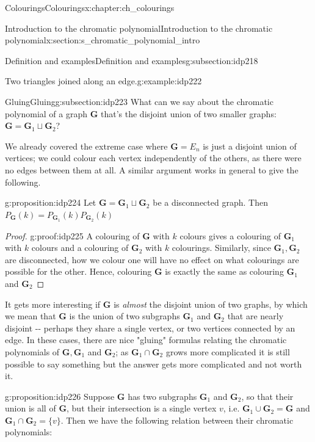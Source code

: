 \documentclass[oneside,10pt,]{book}
\numberwithin{equation}{section}
\newcommand{\bfG}{\mathbf{G}}
\begin{document}
\begin{chapterptx}{Colourings}{}{Colourings}{}{}{x:chapter:ch_colourings}
\begin{sectionptx}{Introduction to the chromatic polynomial}{}{Introduction to the chromatic polynomial}{}{}{x:section:s_chromatic_polynomial_intro}
\begin{subsectionptx}{Definition and examples}{}{Definition and examples}{}{}{g:subsection:idp218}
\begin{example}{Two triangles joined along an edge.}{g:example:idp222}
\begin{sidebyside}{2}{0.025}{0.025}{0.05}
\begin{sbspanel}{0.3}
{\begin{tikzpicture}[scale=2]
\end{tikzpicture}
}%
\end{sbspanel}%
\end{sidebyside}%
\end{example}
\end{subsectionptx}
%
%
\typeout{************************************************}
\typeout{************************************************}
%
\begin{subsectionptx}{Gluing}{}{Gluing}{}{}{g:subsection:idp223}
What can we say about the chromatic polynomial of a graph \(\bfG\) that's the disjoint union of two smaller graphs: \(\bfG=\bfG_1\sqcup \bfG_2\)?%
\par
We already covered the extreme case where \(\bfG=E_n\) is just a disjoint union of vertices; we could colour each vertex independently of the others, as there were no edges between them at all. A similar argument works in general to give the following.%
\begin{proposition}{}{}{g:proposition:idp224}%
Let \(\bfG=\bfG_1\sqcup \bfG_2\) be a disconnected graph.  Then \(P_{\bfG}(k)=P_{\bfG_1}(k)P_{\bfG_2}(k)\)%
\end{proposition}
\begin{proof}{}{g:proof:idp225}
A colouring of \(\bfG\) with \(k\) colours gives a colouring of \(\bfG_1\) with \(k\) colours and a colouring of \(\bfG_2\) with \(k\) colourings. Similarly, since \(\bfG_1, \bfG_2\) are disconnected, how we colour one will have no effect on what colourings are possible for the other.  Hence, colouring \(\bfG\) is exactly the same as colouring \(\bfG_1\) and \(\bfG_2\)%
\end{proof}
 It gets more interesting if \(\bfG\) is \emph{almost} the disjoint union of two graphs, by which we mean that \(\bfG\) is the union of two subgraphs \(\bfG_1\) and \(\bfG_2\) that are nearly disjoint -{}-{} perhaps they share a single vertex, or two vertices connected by an edge.  In these cases, there are nice "gluing" formulas relating the chromatic polynomials of \(\bfG, \bfG_1\) and \(\bfG_2\); as \(\bfG_1\cap\bfG_2\) grows more complicated it is still possible to say something but the answer gets more complicated and not worth it. \begin{proposition}{}{}{g:proposition:idp226}%
Suppose \(\bfG\) has two subgraphs \(\bfG_1\) and \(\bfG_2\), so that their union is all of \(\bfG\), but their intersection is a single vertex \(v\), i.e. \(\bfG_1\cup\bfG_2=\bfG\) and \(\bfG_1\cap\bfG_2=\{v\}\).  Then we have the following relation between their chromatic polynomials:%

\end{proposition}
\end{subsectionptx}
\end{sectionptx}
\end{chapterptx}
\end{document}
